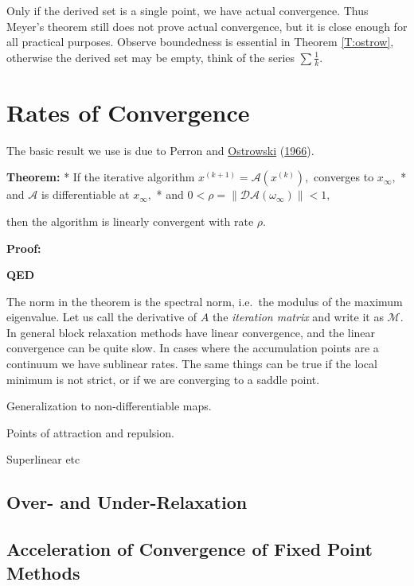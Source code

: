\documentclass[
  12pt,
]{book}
\begin{document}
Only if the derived set is a single point, we have actual convergence.
Thus Meyer's theorem still does not prove actual
convergence, but it is close enough for all practical purposes.
Observe boundedness is essential in Theorem \ref{T:ostrow}, otherwise
the derived set may be empty, think
of the series \(\sum\frac{1}{k}.\)

\hypertarget{rates-of-convergence}{%
\section{Rates of Convergence}\label{rates-of-convergence}}

The basic result we use is due to Perron and \protect\hyperlink{ref-ostrowski_66}{Ostrowski} (\protect\hyperlink{ref-ostrowski_66}{1966}).

\textbf{Theorem:}
* If the iterative algorithm \(x^{(k+1)}=\mathcal{A}(x^{(k)}),\)
converges to \(x_\infty,\)
* and \(\mathcal{A}\) is differentiable at \(x_\infty,\)
* and \(0<\rho=\|\mathcal{D}\mathcal{A}(\omega_\infty)\|<1,\)

then the algorithm is linearly convergent with rate \(\rho.\)

\textbf{Proof:}

\textbf{QED}

The norm in the theorem is the spectral norm, i.e.~the modulus of the
maximum eigenvalue. Let us call the derivative of \(A\) the
\emph{iteration matrix} and write it as \(\mathcal{M}.\)
In general block relaxation methods have linear
convergence, and the linear convergence can be quite slow.
In cases where the accumulation points are a continuum
we have sublinear rates. The same things can be true if the local minimum
is not strict, or if we are converging to a saddle point.

Generalization to non-differentiable maps.

Points of attraction and repulsion.

Superlinear etc

\hypertarget{over--and-under-relaxation}{%
\subsection{Over- and Under-Relaxation}\label{over--and-under-relaxation}}

\hypertarget{acceleration-of-convergence-of-fixed-point-methods}{%
\subsection{Acceleration of Convergence of Fixed Point Methods}\label{acceleration-of-convergence-of-fixed-point-methods}}
\end{document}
